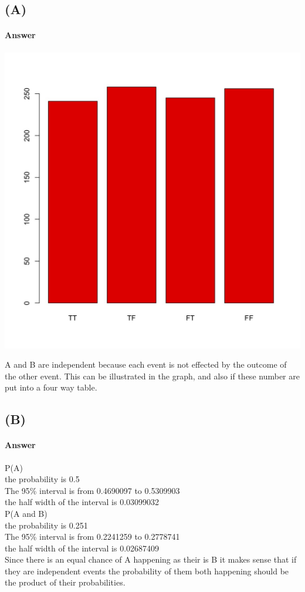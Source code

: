 \documentclass[12pt]{article}
\begin{document}
\subsection*{(A)}

\paragraph{Answer}
\begin{center}
	\includegraphics[width=\linewidth]{problem3Achart.jpg}
\end{center}
A and B are independent because each event is not effected by the outcome of the other event. This can be illustrated in the graph, and also if these number are put into a four way table.

\subsection*{(B)}

\paragraph{Answer}
P(A)\\
the probability is  0.5 \\
The 95\% interval is from  0.4690097 to 0.5309903\\
the half width of the interval is  0.03099032 \\
P(A and B)\\
the probability is  0.251 \\
The 95\% interval is from  0.2241259 to 0.2778741\\
the half width of the interval is  0.02687409\\
Since there is an equal chance of A happening as their is B it makes sense that if they are independent events the probability of them both happening should be the product of their probabilities. 
\end{document}
